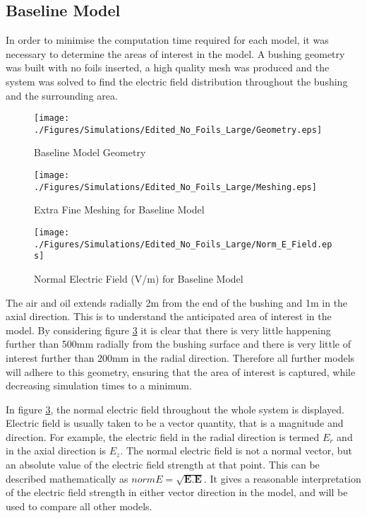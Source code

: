 \subsection{Baseline Model}
In order to minimise the computation time required for each model, it was necessary to determine the areas of interest in the model.
A bushing geometry was built with no foils inserted, a high quality mesh was produced and the system was solved to find the electric field distribution throughout the bushing and the surrounding area.
\begin{figure}[!h]
  \centering
    \texttt{[image: ./Figures/Simulations/Edited\_No\_Foils\_Large/Geometry.eps]} 
\caption{Baseline Model Geometry}
\label{Figure:No_Foil_Large_Geom}
\end{figure}

\begin{figure}[!h]
  \centering
    \texttt{[image: ./Figures/Simulations/Edited\_No\_Foils\_Large/Meshing.eps]} 
\caption{Extra Fine Meshing for Baseline Model}
\label{Figure:No_Foil_Large_Mesh}
\end{figure}

\begin{figure}[!h]
  \centering
    \texttt{[image: ./Figures/Simulations/Edited\_No\_Foils\_Large/Norm\_E\_Field.eps]} 
\caption{Normal Electric Field (V/m) for Baseline Model}
\label{Figure:No_Foil_Large_Field}
\end{figure}

The air and oil extends radially 2m from the end of the bushing and 1m in the axial direction.
This is to understand the anticipated area of interest in the model.
By considering figure \ref{Figure:No_Foil_Large_Field} it is clear that there is very little happening further than 500mm radially from the bushing surface and there is very little of interest further than 200mm in the radial direction.
Therefore all further models will adhere to this geometry, ensuring that the area of interest is captured, while decreasing simulation times to a minimum.

In figure \ref{Figure:No_Foil_Large_Field}, the normal electric field throughout the whole system is displayed.
Electric field is usually taken to be a vector quantity, that is a magnitude and direction. 
For example, the electric field in the radial direction is termed $E_r$ and in the axial direction is $E_z$.
The normal electric field is not a normal vector, but an absolute value of the electric field strength at that point. 
This can be described mathematically as $normE = \sqrt{\mathbf{E}.\mathbf{E}}$.
It gives a reasonable interpretation of the electric field strength in either vector direction in the model, and will be used to compare all other models.

